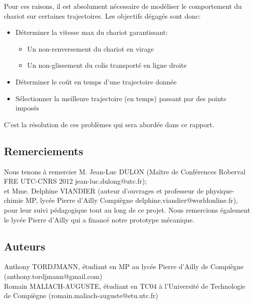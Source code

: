 Pour ces raisons, il est absolument nécessaire de modéliser le comportement du chariot sur certaines trajectoires. Les objectifs dégagés sont donc:
\begin{itemize}
	\item Déterminer la vitesse max du chariot garantissant:
		\begin{itemize}
			\item Un non-renversement du chariot en virage
			\item Un non-glissement du colis transporté en ligne droite
		\end{itemize}
	\item Déterminer le coût en temps d'une trajectoire donnée
	\item Sélectionner la meilleure trajectoire (en temps) passant par des points imposés
\end{itemize}

C'est la résolution de ces problèmes qui sera abordée dans ce rapport.


\subsection{Remerciements}
Nous tenons à remercier M. Jean-Luc DULON (Maître de Conférences Roberval FRE UTC-CNRS 2012 jean-luc.dulong@utc.fr);\\
et Mme. Delphine VIANDIER (auteur d'ouvrages et professeur de physique-chimie MP, lycée Pierre d'Ailly Compiègne delphine.viandier@worldonline.fr),\\
pour leur suivi pédagogique tout au long de ce projet.
Nous remercions également le lycée Pierre d'Ailly qui a financé notre prototype mécanique.\\
\subsection{Auteurs}
Anthony TORDJMANN, étudiant en MP au lycée Pierre d'Ailly de Compiègne (anthony.tordjmann@gmail.com)\\
Romain MALIACH-AUGUSTE, étudiant en TC04 à l'Université de Technologie de Compiègne (romain.maliach-auguste@etu.utc.fr)
